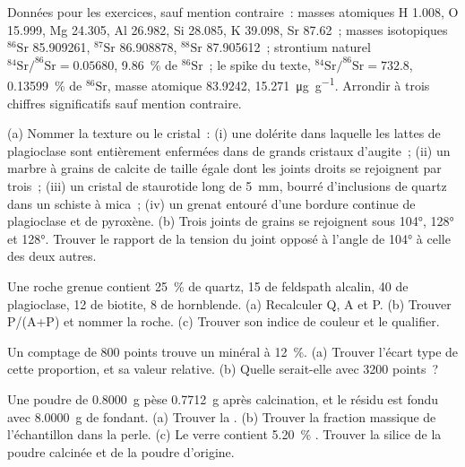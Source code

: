 Données pour les exercices, sauf mention contraire~: masses atomiques H 1.008, O 15.999, Mg 24.305, Al
26.982, Si 28.085, K 39.098, Sr 87.62~; masses isotopiques $^{86}\mathrm{Sr}$ 85.909261,
$^{87}\mathrm{Sr}$ 86.908878, $^{88}\mathrm{Sr}$ 87.905612~; strontium naturel
$^{84}\mathrm{Sr}/^{86}\mathrm{Sr} = 0.05680$, \qty{9.86}{\percent} de $^{86}\mathrm{Sr}$~; le spike
du texte, $^{84}\mathrm{Sr}/^{86}\mathrm{Sr} = 732.8$, \qty{0.13599}{\percent} de
$^{86}\mathrm{Sr}$, masse atomique 83.9242, \qty{15.271}{\micro\gram\per\gram}. Arrondir à trois
chiffres significatifs sauf mention contraire.

\begin{exercise}[$\star$]\label{exo:b2:field-lab-methods-2:1}
(a) Nommer la texture ou le cristal~: (i) une dolérite dans laquelle les lattes de plagioclase sont entièrement enfermées dans
de grands cristaux d'augite~; (ii) un marbre à grains de calcite de taille égale dont les joints droits se rejoignent par
trois~; (iii) un cristal de staurotide long de \qty{5}{mm}, bourré d'inclusions de quartz dans un schiste à mica~;
(iv) un grenat entouré d'une bordure continue de plagioclase et de pyroxène. (b) Trois joints de grains
se rejoignent sous \ang{104}, \ang{128} et \ang{128}. Trouver le rapport de la tension du joint opposé à
l'angle de \ang{104} à celle des deux autres.
\end{exercise}

\begin{exercise}[$\star$]\label{exo:b2:field-lab-methods-2:2}
Une roche grenue contient \qty{25}{\percent} de quartz, 15 de feldspath alcalin, 40 de plagioclase, 12
de biotite, 8 de hornblende. (a) Recalculer Q, A et P. (b) Trouver P/(A+P) et nommer la roche. (c) Trouver
son indice de couleur et le qualifier.
\end{exercise}

\begin{exercise}[$\star$]\label{exo:b2:field-lab-methods-2:3}
Un comptage de 800 points trouve un minéral à \qty{12}{\percent}. (a) Trouver l'écart type de
cette proportion, et sa valeur relative. (b) Quelle serait-elle avec 3200 points~?
\end{exercise}

\begin{exercise}[$\star$]\label{exo:b2:field-lab-methods-2:4}
Une poudre de \qty{0.8000}{g} pèse \qty{0.7712}{g} après calcination, et le résidu est fondu avec
\qty{8.0000}{g} de fondant. (a) Trouver la . (b) Trouver la fraction massique de l'échantillon dans
la perle. (c) Le verre contient \qty{5.20}{\percent} . Trouver la silice de la poudre calcinée
et de la poudre d'origine.
\end{exercise}

